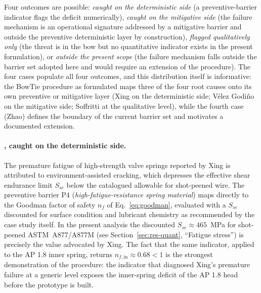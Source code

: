 Four outcomes are possible: \emph{caught on the deterministic side}
(a preventive-barrier indicator flags the deficit numerically),
\emph{caught on the mitigative side} (the failure mechanism is an
operational signature addressed by a mitigative barrier and outside
the preventive deterministic layer by construction),
\emph{flagged qualitatively only} (the threat is in the bow but no
quantitative indicator exists in the present formulation), or
\emph{outside the present scope} (the failure mechanism falls
outside the barrier set adopted here and would require an extension
of the procedure). The four cases populate all four outcomes, and
this distribution itself is informative: the BowTie procedure as
formulated maps three of the four root causes onto its own
preventive or mitigative layer (Xing on the deterministic side;
V\'elez Godi\~no on the mitigative side; Soffritti at the qualitative
level), while the fourth case (Zhao) defines the boundary of the
current barrier set and motivates a documented extension.

\paragraph{\citet{xing2021valvespringEAC}, caught on the
deterministic side.}
The premature fatigue of high-strength valve springs reported by
Xing is attributed to environment-assisted cracking, which depresses
the effective shear endurance limit $S_{se}$ below the catalogued
allowable for shot-peened wire. The preventive barrier P4
(\emph{high-fatigue-resistance spring material}) maps directly to
the Goodman factor of safety
$n_{f}$ of Eq.~\eqref{eq:goodman}, evaluated with a $S_{se}$
discounted for surface condition and lubricant chemistry as
recommended by the case study itself. In the present analysis the
discounted $S_{se}\approx 465$~MPa for shot-peened ASTM~A877/A877M
(see Section~\ref{sec:res-quant}, ``Fatigue stress'') is precisely
the value advocated by Xing. The fact that the same indicator,
applied to the AP 1.8 inner spring, returns
$n_{f,\mathrm{in}}\approx 0.68 < 1$ is the strongest demonstration
of the procedure: the indicator that diagnosed Xing's premature
failure at a generic level exposes the inner-spring deficit of the
AP 1.8 head before the prototype is built.

